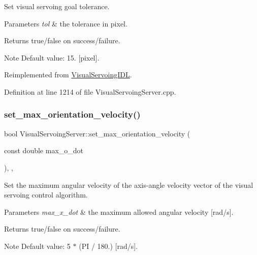 Set visual servoing goal tolerance. 


\begin{DoxyParams}{Parameters}
{\em tol} & the tolerance in pixel. \\
\hline
\end{DoxyParams}
\begin{DoxyReturn}{Returns}
true/false on success/failure. 
\end{DoxyReturn}
\begin{DoxyNote}{Note}
Default value\+: 15. \mbox{[}pixel\mbox{]}. 
\end{DoxyNote}


Reimplemented from \hyperlink{classVisualServoingIDL_aa465471a7300861c1f991f08eb257694}{Visual\+Servoing\+I\+DL}.



Definition at line 1214 of file Visual\+Servoing\+Server.\+cpp.

\mbox{\label{classVisualServoingServer_aa3226ef2de2c1743e67788d1bff60679}} 
\subsubsection{\texorpdfstring{set\+\_\+max\+\_\+orientation\+\_\+velocity()}{set\_max\_orientation\_velocity()}}
{\footnotesize\ttfamily bool Visual\+Servoing\+Server\+::set\+\_\+max\+\_\+orientation\+\_\+velocity (\begin{DoxyParamCaption}\item[{const double}]{max\+\_\+o\+\_\+dot }\end{DoxyParamCaption})\hspace{0.3cm}{\ttfamily [override]}, {\ttfamily [protected]}, {\ttfamily [virtual]}}



Set the maximum angular velocity of the axis-\/angle velocity vector of the visual servoing control algorithm. 


\begin{DoxyParams}{Parameters}
{\em max\+\_\+x\+\_\+dot} & the maximum allowed angular velocity \mbox{[}rad/s\mbox{]}. \\
\hline
\end{DoxyParams}
\begin{DoxyReturn}{Returns}
true/false on success/failure. 
\end{DoxyReturn}
\begin{DoxyNote}{Note}
Default value\+: 5 $\ast$ (PI / 180.) \mbox{[}rad/s\mbox{]}. 
\end{DoxyNote}


